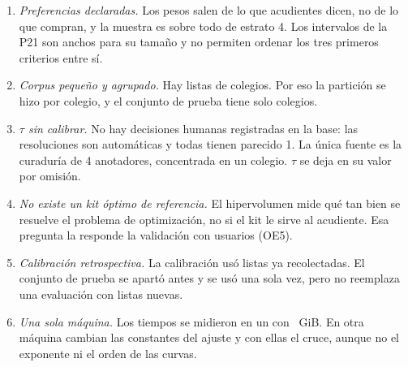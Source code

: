 \begin{enumerate}[label=\textbf{A\arabic*.}]
  \item \emph{Preferencias declaradas.} Los pesos salen de lo que
  \calEncuestados{} acudientes dicen, no de lo que compran, y la muestra es
  sobre todo de estrato 4. Los intervalos de la P21 son anchos para su tamaño
  y no permiten ordenar los tres primeros criterios entre sí.
  \item \emph{Corpus pequeño y agrupado.} Hay \calListas{} listas de
  \calColegios{} colegios. Por eso la partición se hizo por colegio, y el
  conjunto de prueba tiene solo \calColegiosPrueba{} colegios.
  \item \emph{$\tau$ sin calibrar.} No hay decisiones humanas registradas en la
  base: las \calTauTransiciones{} resoluciones son automáticas y todas tienen
  parecido 1. La única fuente es la curaduría de 4 anotadores, concentrada en un
  colegio. $\tau$ se deja en su valor por omisión.
  \item \emph{No existe un kit óptimo de referencia.} El hipervolumen mide qué
  tan bien se resuelve el problema de optimización, no si el kit le sirve al
  acudiente. Esa pregunta la responde la validación con usuarios (OE5).
  \item \emph{Calibración retrospectiva.} La calibración usó listas ya
  recolectadas. El conjunto de prueba se apartó antes y se usó una sola vez,
  pero no reemplaza una evaluación con listas nuevas.
  \item \emph{Una sola máquina.} Los tiempos se midieron en un \calCPU{} con
  \calRAM~GiB. En otra máquina cambian las constantes del ajuste y con ellas el
  cruce, aunque no el exponente ni el orden de las curvas.
\end{enumerate}
